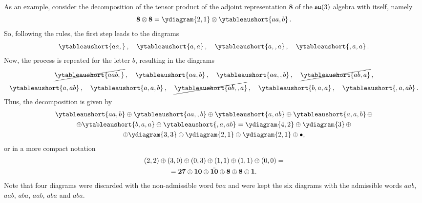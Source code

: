 \begin{ex}
    As an example, consider the decomposition of the tensor product of the adjoint representation $\bm{8}$ of the $\mathfrak{su}(3)$ algebra with itself, namely
    \begin{equation}
        \bm{8} \ot \bm{8} = \ydiagram{2,1} \ot \ytableaushort{aa,b}\,.
    \end{equation}
    So, following the rules, the first step leads to the diagrams
    \begin{equation}
        \ytableaushort{{}{}aa,{}}
        \,,\quad
        \ytableaushort{{}{}a,{}a}
        \,,\quad
        \ytableaushort{{}{}a,{},a}
        \,,\quad
        \ytableaushort{{}{},{}a,a}\,.
    \end{equation}
    Now, the process is repeated for the letter $b$, resulting in the diagrams
    \begin{gather}
        \cancel{\ytableaushort{{}{}aab,{}}}
        \,,\quad
        \ytableaushort{{}{}aa,{}b}
        \,,\quad
        \ytableaushort{{}{}aa,{},b}
        \,,\quad
        \cancel{\ytableaushort{{}{}ab,{}a}}
        \,, \\
        \ytableaushort{{}{}a,{}ab}
        \,,\quad
        \ytableaushort{{}{}a,{}a,b}
        \,,\quad
        \cancel{\ytableaushort{{}{}ab,{},a}}
        \,,\quad
        \ytableaushort{{}{}b,{}a,a}
        \,,\quad
        \ytableaushort{{}{},{}a,ab}
        \,.
    \end{gather}
    Thus, the decomposition is given by
    \begin{multline}
        \ytableaushort{{}{}aa,{}b} \op \ytableaushort{{}{}aa,{},b} \op \ytableaushort{{}{}a,{}ab} \op \ytableaushort{{}{}a,{}a,b}\, \op \\
        \op \ytableaushort{{}{}b,{}a,a} \op \ytableaushort{{}{},{}a,ab} = \ydiagram{4,2} \op \ydiagram{3}\, \op \\ \op \ydiagram{3,3} \op \ydiagram{2,1} \op \ydiagram{2,1} \op \bullet,
    \end{multline}
    or in a more compact notation
    \begin{multline}
        (2,2) \oplus (3,0) \oplus (0,3) \oplus (1,1) \oplus (1,1) \oplus (0,0) = \\ = \bm{27} \oplus \bm{10} \oplus \bar{\bm{10}} \oplus \bm{8} \oplus \bm{8} \oplus \bm{1}.
    \end{multline}
    Note that four diagrams were discarded with the non-admissible word $baa$ and were kept the six diagrams with the admissible words $aab$, $aab$, $aba$, $aab$, $aba$ and $aba$.
\end{ex}
